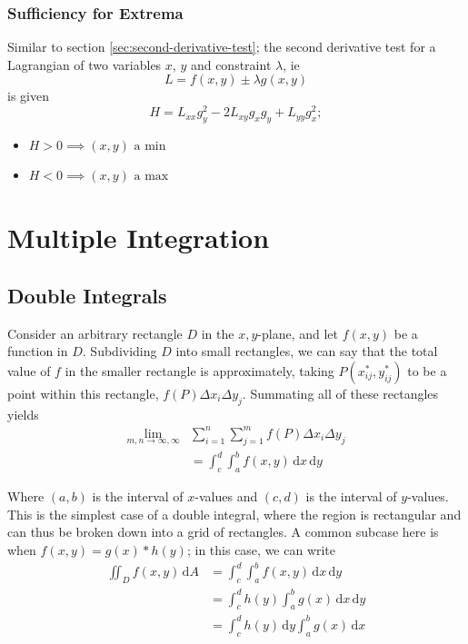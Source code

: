 \documentclass[12pt]{article}
\begin{document}
{\subsubsection{Sufficiency for Extrema}
Similar to section \ref{sec:second-derivative-test}; the second derivative test for a Lagrangian of two variables $x$, $y$ and constraint $\lambda$, ie \[L = f(x,y) \pm \lambda g(x,y)\] is given \[H = L_{xx} g_y^2 - 2 L_{xy}g_x g_y + L_{yy}g_x^2;\] \begin{itemize}
    \item $H > 0 \implies (x,y) \text{ a min}$
    \item $H < 0 \implies (x,y) \text{ a max}$
\end{itemize}

\newpage
\section{Multiple Integration}
\subsection{Double Integrals}
Consider an arbitrary rectangle $D$ in the $x,y$-plane, and let $f(x,y)$ be a function in $D$. Subdividing $D$ into small rectangles, we can say that the total value of $f$ in the smaller rectangle is approximately, taking $P(x^*_{ij}, y^*_{ij})$ to be a point within this rectangle, $f(P) \Delta x_i \Delta y_j$. Summating all of these rectangles yields \begin{align*}
    \lim_{m, n \to \infty, \infty}& \sum_{i = 1}^n \sum_{j=1}^m f(P) \Delta x_i \Delta y_j \\
    &= \int_c^d \int_a^b f(x,y) \, \text{d}x \, \text{d}y
\end{align*}

Where $(a,b)$ is the interval of $x$-values and $(c,d)$ is the interval of $y$-values. This is the simplest case of a double integral, where the region is rectangular and can thus be broken down into a grid of rectangles. A common subcase here is when $f(x,y) = g(x) * h(y)$; in this case, we can write \begin{align*}
   \iint_D f(x,y) \, \text{d}A &= \int_c^d \int_a^b f(x,y) \, \text{d}x \, \text{d}y\\
   &= \int_c^d h(y) \int_a^b g(x) \, \text{d}x \, \text{d}y\\
   &= \int_c^d h(y) \, \text{d}y \int_a^b g(x) \, \text{d}x\\
\end{align*}

}
\end{document}
